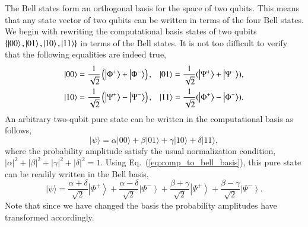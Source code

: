 The Bell states form an orthogonal basis for the space of two qubits.
This means that any state vector of two qubits can be written in terms of the four Bell states.
We begin with rewriting the computational basis states of two qubits $\{\left| 00 \right\rangle,\left| 01 \right\rangle,\left| 10 \right\rangle,\left| 11 \right\rangle\}$ in terms of the Bell states.
It is not too difficult to verify that the following equalities are indeed true,
\begin{equation}
    \begin{aligned}
    |00\rangle &=\frac{1}{\sqrt{2}}\left(\left|\Phi^{+}\right\rangle+\left|\Phi^{-}\right\rangle\right), & 
    \ket{01} = \frac{1}{\sqrt2}(\ket{\Psi^{+}} + \ket{\Psi^{-}}), \\
    |10\rangle &=\frac{1}{\sqrt{2}}\left(\left|\Psi^{+}\right\rangle-\left|\Psi^{-}\right\rangle\right), & 
    \ket{11} = \frac{1}{\sqrt2}(\ket{\Phi^{+}} - \ket{\Phi^{-}}).
    \label{eq:comp_to_bell_basis}
    \end{aligned}
\end{equation}
An arbitrary two-qubit pure state can be written in the computational basis as follows,
\begin{equation}
    |\psi\rangle=\alpha|00\rangle+\beta|01\rangle+\gamma|10\rangle+\delta|11\rangle,
\end{equation}
where the probability amplitude satisfy the usual normalization condition, $|\alpha|^2+|\beta|^2+|\gamma|^2+|\delta|^2=1$.
Using Eq.~(\ref{eq:comp_to_bell_basis}), this pure state can be readily written in the Bell basis,
\begin{equation}
    |\psi\rangle=\frac{\alpha+\delta}{\sqrt{2}}\left|\Phi^{+}\right\rangle+\frac{\alpha-\delta}{\sqrt{2}}\left|\Phi^{-}\right\rangle+\frac{\beta+\gamma}{\sqrt{2}}\left|\Psi^{+}\right\rangle+\frac{\beta-\gamma}{\sqrt{2}}\left|\Psi^{-}\right\rangle.
    \label{eq:psi_bell_basis}
\end{equation}
Note that since we have changed the basis the probability amplitudes have transformed accordingly.

